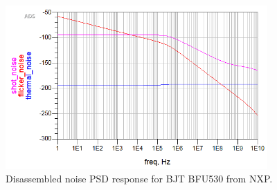 \begin{figure}[H] 
\centering
\includegraphics[width=10cm]{images/partial_noise.png}
\caption{Disassembled noise PSD response for BJT BFU530 from NXP.}
\label{fig:bjt2} 
\end{figure}